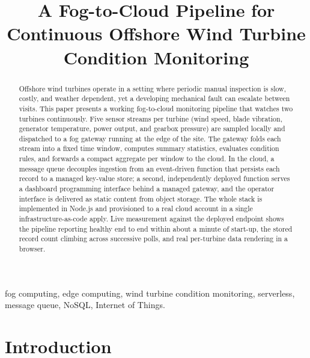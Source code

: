 \documentclass[conference]{IEEEtran}
\begin{document}
\title{A Fog-to-Cloud Pipeline for Continuous Offshore Wind Turbine Condition Monitoring}

\author{
}

\maketitle

\begin{abstract}
Offshore wind turbines operate in a setting where periodic manual inspection is slow, costly, and weather dependent, yet a developing mechanical fault can escalate between visits. This paper presents a working fog-to-cloud monitoring pipeline that watches two turbines continuously. Five sensor streams per turbine (wind speed, blade vibration, generator temperature, power output, and gearbox pressure) are sampled locally and dispatched to a fog gateway running at the edge of the site. The gateway folds each stream into a fixed time window, computes summary statistics, evaluates condition rules, and forwards a compact aggregate per window to the cloud. In the cloud, a message queue decouples ingestion from an event-driven function that persists each record to a managed key-value store; a second, independently deployed function serves a dashboard programming interface behind a managed gateway, and the operator interface is delivered as static content from object storage. The whole stack is implemented in Node.js and provisioned to a real cloud account in a single infrastructure-as-code apply. Live measurement against the deployed endpoint shows the pipeline reporting healthy end to end within about a minute of start-up, the stored record count climbing across successive polls, and real per-turbine data rendering in a browser.
\end{abstract}

\begin{IEEEkeywords}
fog computing, edge computing, wind turbine condition monitoring, serverless, message queue, NoSQL, Internet of Things.
\end{IEEEkeywords}

\section{Introduction}
\end{document}
